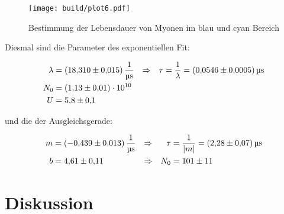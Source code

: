 \begin{figure}[H]
	\centering
	\texttt{[image: build/plot6.pdf]}
	\caption{Bestimmung der Lebensdauer von Myonen im blau und cyan Bereich}\label{fig:plt6}
\end{figure}

\newpage
Diesmal sind die Parameter des exponentiellen Fit:

\begin{align}
	\lambda&=\qty{18.31(0.015)}{\per\us} &\Rightarrow & & \tau&=\frac{1}{\lambda }=\qty{0.0546(0.0005)}{\us} \\
	N_0&=\num{1.13(0.1)e10} \notag \\
	U&=\num{5.8(1)} \notag
\end{align}

und die der Ausgleichsgerade:

\begin{align}
	m&=\qty{-0.439(0.013)}{\per\us} &\Rightarrow & & \tau&=\frac{1}{|m|}=\qty{2.28(0.07)}{\us} \\
	b&=\num{4.61(0.11)} &\Rightarrow & & N_0&=\num{101(11)} \notag
\end{align}

\newpage
\section{Diskussion}


\newpage
\printbibliography

